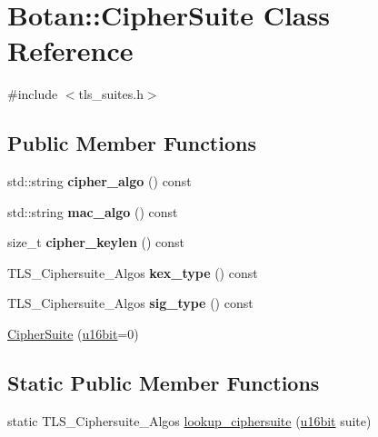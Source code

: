\hypertarget{classBotan_1_1CipherSuite}{\section{Botan\-:\-:Cipher\-Suite Class Reference}
\label{classBotan_1_1CipherSuite}
}


{\ttfamily \#include $<$tls\-\_\-suites.\-h$>$}

\subsection*{Public Member Functions}
\begin{DoxyCompactItemize}
\item 
\hypertarget{classBotan_1_1CipherSuite_abe7493ba3e16b501de323fb8a347e638}{std\-::string {\bfseries cipher\-\_\-algo} () const }\label{classBotan_1_1CipherSuite_abe7493ba3e16b501de323fb8a347e638}

\item 
\hypertarget{classBotan_1_1CipherSuite_afa832e8e74b6ba1035c35cf049422b25}{std\-::string {\bfseries mac\-\_\-algo} () const }\label{classBotan_1_1CipherSuite_afa832e8e74b6ba1035c35cf049422b25}

\item 
\hypertarget{classBotan_1_1CipherSuite_a520a9cf6ed1a813cdfa42c794872663c}{size\-\_\-t {\bfseries cipher\-\_\-keylen} () const }\label{classBotan_1_1CipherSuite_a520a9cf6ed1a813cdfa42c794872663c}

\item 
\hypertarget{classBotan_1_1CipherSuite_a620df9658d9aed6840e2fbbc109365b4}{T\-L\-S\-\_\-\-Ciphersuite\-\_\-\-Algos {\bfseries kex\-\_\-type} () const }\label{classBotan_1_1CipherSuite_a620df9658d9aed6840e2fbbc109365b4}

\item 
\hypertarget{classBotan_1_1CipherSuite_abb5c48154ccf23be7c138ba4f2941629}{T\-L\-S\-\_\-\-Ciphersuite\-\_\-\-Algos {\bfseries sig\-\_\-type} () const }\label{classBotan_1_1CipherSuite_abb5c48154ccf23be7c138ba4f2941629}

\item 
\hyperlink{classBotan_1_1CipherSuite_a05f1be086330bdf2be08f8be3f06b0cc}{Cipher\-Suite} (\hyperlink{namespaceBotan_ab07face63a00c39ea6ed97f203ee501c}{u16bit}=0)
\end{DoxyCompactItemize}
\subsection*{Static Public Member Functions}
\begin{DoxyCompactItemize}
\item 
static T\-L\-S\-\_\-\-Ciphersuite\-\_\-\-Algos \hyperlink{classBotan_1_1CipherSuite_a96199561319b8f814218a5bf0962614f}{lookup\-\_\-ciphersuite} (\hyperlink{namespaceBotan_ab07face63a00c39ea6ed97f203ee501c}{u16bit} suite)
\end{DoxyCompactItemize}


